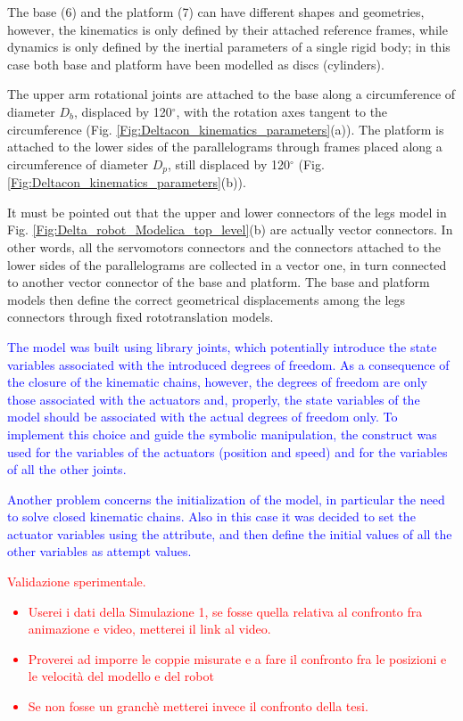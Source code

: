 \documentclass[]{interact}
\theoremstyle{plain}%
\theoremstyle{definition}
\theoremstyle{remark}
\begin{document}
The base (6) and the platform (7) can have different shapes and geometries, however, the kinematics is only defined by their attached reference frames, while dynamics is only defined by the inertial parameters of a single rigid body; in this case both base and platform have been modelled as discs (cylinders).

The upper arm rotational joints are attached to the base along a circumference of diameter $D_b$, displaced by 120$^\circ$, with the rotation axes tangent to the circumference (Fig. \ref{Fig:Deltacon_kinematics_parameters}(a)). The platform is attached to the lower sides of the parallelograms through frames placed along a circumference of diameter $D_p$, still displaced by 120$^\circ$ (Fig. \ref{Fig:Deltacon_kinematics_parameters}(b)).

It must be pointed out that the upper and lower connectors of the legs model in Fig. \ref{Fig:Delta_robot_Modelica_top_level}(b) are actually vector connectors. In other words, all the servomotors connectors and the connectors attached to the lower sides of the parallelograms are collected in a vector one, in turn connected to another vector connector of the base and platform. The base and platform models then define the correct geometrical displacements among the legs connectors through fixed rototranslation models.

\textcolor{blue}{
The model was built using library joints, which potentially introduce the state variables associated with the introduced degrees of freedom.
As a consequence of the closure of the kinematic chains, however, the degrees of freedom are only those associated with the actuators and, properly, the state variables of the model should be associated with the actual degrees of freedom only.
To implement this choice and guide the symbolic manipulation, the construct  was used for the variables of the actuators (position and speed) and  for the variables of all the other joints.
}

\textcolor{blue}{
Another problem concerns the initialization of the model, in particular the need to solve closed kinematic chains.
Also in this case it was decided to set the actuator variables using the  attribute, and then define the initial values of all the other variables as attempt values.
}

\textcolor{red}{
Validazione sperimentale.
\begin{itemize}
  \item Userei i dati della Simulazione 1, se fosse quella relativa al confronto fra animazione e video, metterei il link al video.
  \item Proverei ad imporre le coppie misurate e a fare il confronto fra le posizioni e le velocit\`{a} del modello e del robot
  \item Se non fosse un granch\`{e} metterei invece il confronto della tesi.
\end{itemize}
}
\end{document}
